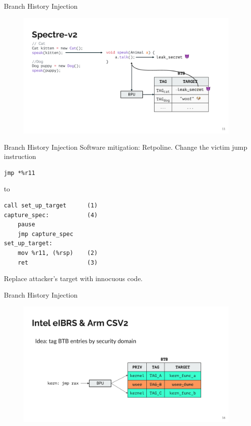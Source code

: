\documentclass{beamer}
\begin{document}
\begin{frame}{Branch History Injection\cite{bhi}}
\begin{figure}
    \begin{center}
        \includegraphics[width=1\textwidth]{img/spectre-v2.pdf}
    \end{center}
\end{figure}
    
\end{frame}

\begin{frame}[fragile]{Branch History Injection\cite{bhi}}
Software mitigation: Retpoline. Change the victim jump instruction \newline
\begin{lstlisting}
jmp *%r11
\end{lstlisting}

to \newline

\begin{lstlisting}
call set_up_target      (1)
capture_spec:           (4)
    pause
    jmp capture_spec
set_up_target:
    mov %r11, (%rsp)    (2)
    ret                 (3)
\end{lstlisting}

Replace attacker's target with innocuous code.
\end{frame}

\begin{frame}{Branch History Injection\cite{bhi}}
    \begin{figure}
        \begin{center}
            \includegraphics[width=1\textwidth]{img/elbrs.pdf}
        \end{center}
    \end{figure} 
\end{frame}
\end{document}
